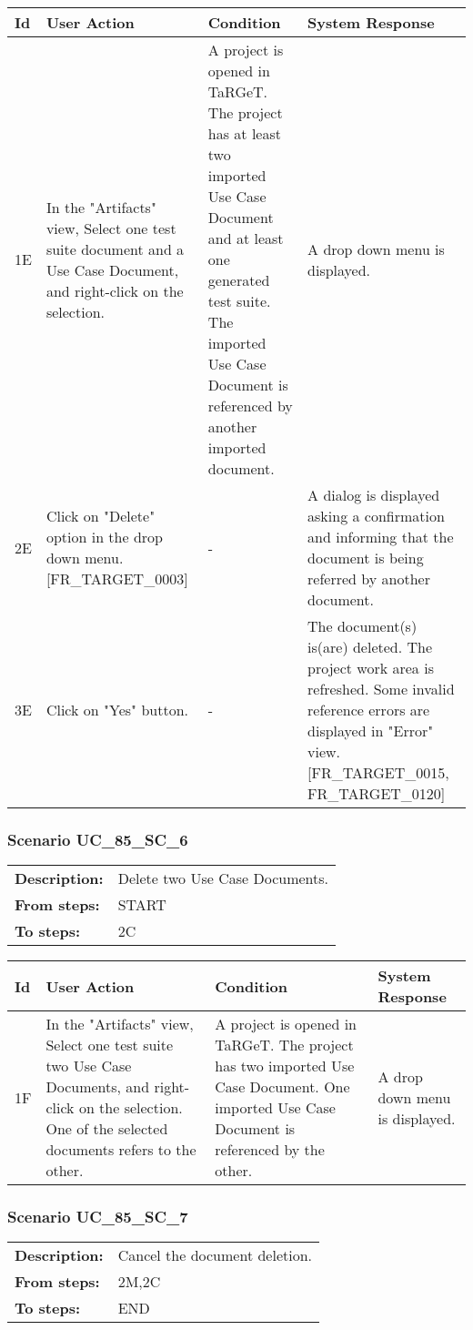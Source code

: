 \documentclass[a4paper,11pt]{article}
\newcommand{\bl}{\\ \hline}
\begin{document}
\begin{tabular}{|p{0.8in}|p{1.6in}|p{1.6in}|p{1.6in}|}
\hline
Id & User Action & Condition & System Response  \bl 
1E & In the "Artifacts" view, Select one test suite document and a Use Case Document, and right-click on the selection. & A project is opened in TaRGeT. The project has at least two imported Use Case Document and at least one generated test suite. The imported Use Case Document is referenced by another imported document. & A drop down menu is displayed. \bl 
2E & Click on "Delete" option in the drop down menu. [FR_TARGET_0003] & - & A dialog is displayed asking a confirmation and informing that the document is being referred by another document. \bl 
3E & Click on "Yes" button. & - & The document(s) is(are) deleted. The project work area is refreshed. Some invalid reference errors are displayed in "Error" view. [FR_TARGET_0015, FR_TARGET_0120] \bl 
\end{tabular}
\subsubsection*{Scenario UC_85_SC_6}
\begin{tabular}{p{1in}p{4in}}
{\bf Description:} & Delete two Use Case Documents. \\
{\bf From steps:} & START \\
{\bf To steps:} & 2C \\
\end{tabular}
 
\begin{tabular}{|p{0.8in}|p{1.6in}|p{1.6in}|p{1.6in}|}
\hline
Id & User Action & Condition & System Response  \bl 
1F & In the "Artifacts" view, Select one test suite two Use Case Documents, and right-click on the selection. One of the selected documents refers to the other. & A project is opened in TaRGeT. The project has two imported Use Case Document. One imported Use Case Document is referenced by the other. & A drop down menu is displayed. \bl 
\end{tabular}
\subsubsection*{Scenario UC_85_SC_7}
\begin{tabular}{p{1in}p{4in}}
{\bf Description:} & Cancel the document deletion. \\
{\bf From steps:} & 2M,2C \\
{\bf To steps:} & END \\
\end{tabular}
 
\end{document}
